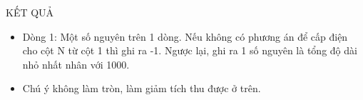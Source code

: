 KẾT QUẢ
\begin{itemize}
	\item     Dòng 1: Một số nguyên trên 1 dòng. Nếu không có phương án để cấp điện cho cột N từ          cột 1 thì ghi ra -1. Ngược lại, ghi ra 1 số nguyên là tổng độ dài nhỏ nhất nhân với 1000.   
	\item     Chú ý không làm tròn, làm giảm tích thu được ở trên.   
\end{itemize}